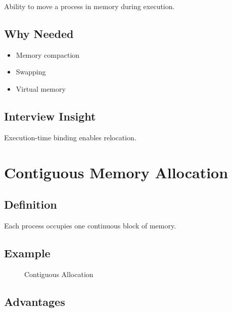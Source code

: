 Ability to move a process in memory during execution.

\subsection{Why Needed}

\begin{itemize}
\item Memory compaction
\item Swapping
\item Virtual memory
\end{itemize}

\subsection{Interview Insight}

Execution-time binding enables relocation.

\section{Contiguous Memory Allocation}

\subsection{Definition}

Each process occupies one continuous block of memory.

\subsection{Example}

\begin{figure}[H]
\centering
{}
\caption{Contiguous Allocation}
\end{figure}

\subsection{Advantages}

